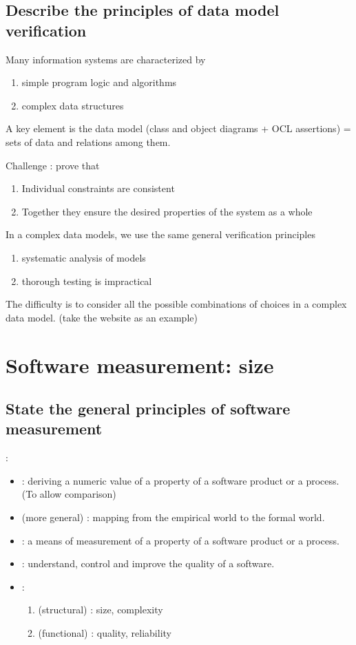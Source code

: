 \newpage
\section{Describe the principles of data model verification}

Many information systems are characterized by 
\begin{enumerate}
    \item simple program logic and algorithms
    \item complex data structures
\end{enumerate}
A key element is the data model (class and object diagrams + OCL assertions) = sets of data and relations among them.

Challenge : prove that 
\begin{enumerate}
    \item Individual constraints are consistent
    \item Together they ensure the desired properties of the system as a whole
\end{enumerate}

In a complex data models, we use the same general verification principles
\begin{enumerate}
    \item systematic analysis of models
    \item thorough testing is impractical
\end{enumerate}
The difficulty is to consider all the possible combinations of choices in a complex data model. (take the website as an example)

\chapter{Software measurement: size}

\section{State the general principles of software measurement}

 :
\begin{itemize}
    \item {} : deriving a numeric value of a property of a software product or a process. (To allow comparison)
    \item {} (more general) : mapping from the empirical world to the formal world.
    \item {} : a means of measurement of a property of a software product or a process.
    \item {} : understand, control and improve the quality of a software.
    \item {} :
    \begin{enumerate}
        \item {} (structural) : size, complexity
        \item {} (functional) : quality, reliability
    \end{enumerate}
\end{itemize}

